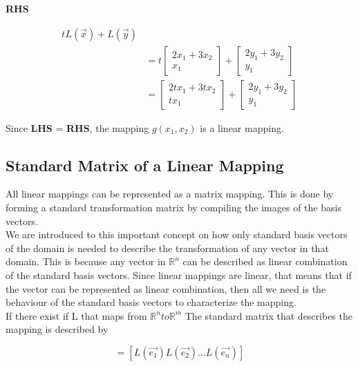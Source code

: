 \documentclass[12pt]{article}
\newcommand{\R}{\mathbb{R}}
\begin{document}
\begin{center}
\textbf{RHS}
\end{center}
\begin{equation}
\begin{split}
tL(\vec{x}) + L(\vec{y})\\
&=t\begin{bmatrix}2x_1 + 3x_2\\x_1\end{bmatrix}+\begin{bmatrix}2y_1+3y_2\\y_1\end{bmatrix}\\
&=\begin{bmatrix}2tx_1 + 3tx_2\\tx_1\end{bmatrix} + \begin{bmatrix}2y_1+3y_2\\y_1\end{bmatrix}
\end{split}
\end{equation}


Since \textbf{LHS} = \textbf{RHS}, the mapping $g(x_1,x_2)$ is a linear mapping.

\subsection{Standard Matrix of a Linear Mapping}
All linear mappings can be represented as a matrix mapping. This is done by forming a standard transformation matrix by compiling the images of the basis vectors.\\
We are introduced to this important concept on how only standard basis vectors of the domain is needed to describe the transformation of any vector in that domain. This is because any vector in $\R^n$ can be described as linear combination of the standard basis vectors. Since linear mappings are linear, that means that if the vector can be represented as linear combination, then all we need is the behaviour of the standard basis vectors to characterize the mapping.\\
If there exist if L that maps from $\R^n to \R^m$
The standard matrix that describes the mapping is described by 

\begin{equation}
[L] = [L(\vec{e_1}) L(\vec{e_2}) ... L(\vec{e_n})]
\end{equation}
\end{document}
